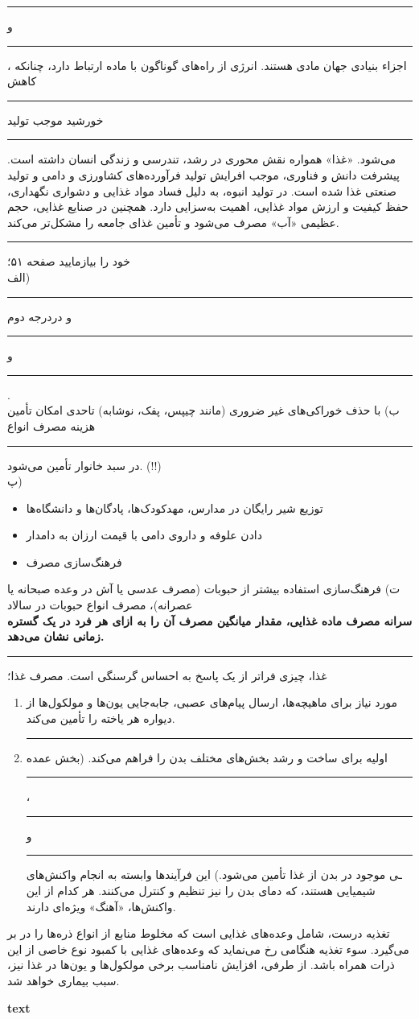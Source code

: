 \documentclass[a4paper,12pt]{article}
\newenvironment{en}
	{\begin{enumerate}\setlength\itemsep{-0.5em}}
	{\end{enumerate}}
\newenvironment{iit}
	{\begin{itemize}\setlength\itemsep{-0.5em}}
	{\end{itemize}}
\newcommand{\ff}{\rule{1cm}{0.15mm}\;}
\newcommand{\fs}{\rule{1cm}{0.15mm}}
\begin{document}
	

	\ff و \ff ،‌ اجزاء بنیادی جهان مادی هستند. انرژی از راه‌های گوناگون با ماده ارتباط دارد، چنانکه کاهش \ff خورشید موجب تولید \ff می‌شود. «غذا» همواره نقش محوری در رشد، تندرسی و زندگی انسان داشته است. پیشرفت دانش و فناوری، موجب افرایش تولید فرآورده‌های کشاورزی و دامی و تولید صنعتی غذا شده است. در تولید انبوه، به دلیل فساد مواد غذایی و دشواری نگهداری، حفظ کیفیت و ارزش مواد غذایی، اهمیت به‌سزایی دارد. همچنین در صنایع غذایی، حجم عظیمی «آب» مصرف می‌شود و تأمین غذای جامعه را مشکل‌تر می‌کند.
	\vspace{4pt}
		\hrule
	\vspace{12pt}

خود را بیازمایید صفحه ۵۱؛\\
الف) \ff و دردرجه دوم 
\ff 
 و  
\ff.\\
ب) با حذف خوراکی‌های غیر ضروری (مانند چیپس، پفک، نوشابه) تاحدی امکان تأمین هزینه مصرف انواع \ff در سبد خانوار تأمین می‌شود. (!!)\\
پ)
\begin{iit}
	\item توزیع شیر رایگان در مدارس، مهدکودک‌ها، پادگان‌ها و دانشگاه‌ها
 
 	\item دادن علوفه و داروی دامی با قیمت ارزان به دامدار 
 
 	\item فرهنگ‌سازی مصرف
\end{iit}
ت) فرهنگ‌سازی استفاده بیشتر از حبوبات (مصرف عدسی یا آش در وعده صبحانه یا عصرانه)، مصرف انواع حبوبات در سالاد\\
\textbf {سرانه مصرف ماده غذایی، مقدار میانگین مصرف آن را به ازای هر فرد در یک گستره زمانی نشان می‌دهد.}
\vspace{4pt}
\hrule
\begin{center}
	غذا، چیزی فراتر از یک پاسخ به احساس گرسنگی است. مصرف غذا؛
\end{center}

\begin{en}
	\item مورد نیاز برای ماهیچه‌ها، ارسال پیام‌های عصبی، جابه‌جایی یون‌ها و مولکول‌ها از دیواره هر یاخته را تأمین می‌کند.
	\item \ff اولیه برای ساخت و رشد بخش‌های مختلف بدن را فراهم می‌کند. (بخش عمده \ff ، \ff  و \fs ـی موجود در بدن از غذا تأمین می‌شود.) این فرآیند‌ها وابسته به انجام واکنش‌های شیمیایی هستند، که دمای بدن را نیز تنظیم و کنترل می‌کنند. هر کدام از این واکنش‌ها، «آهنگ» ویژه‌ای دارند.
\end{en}

تغذیه درست، شامل وعده‌های غذایی است که مخلوط منابع از انواع ذره‌ها را در بر می‌گیرد. سوء تغذیه هنگامی رخ می‌نماید که وعده‌های غذایی با کمبود نوع خاصی از این ذرات همراه باشد. از طرفی، افزایش نامناسب برخی مولکول‌ها و یون‌ها در غذا نیز، سبب بیماری خواهد شد.\\
\begin{center}
	\textbf{text}
\end{center}
\end{document}
